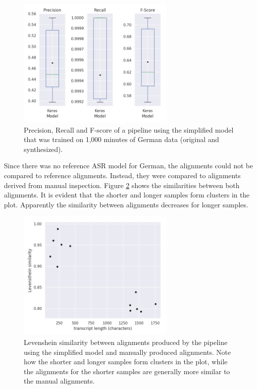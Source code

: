 \documentclass[letterpaper]{article}
\begin{document}
\begin{figure}[!htb]
	\begin{center}
		\includegraphics[width=3in]{boxplot_de.png}
		\caption{Precision, Recall and F-score of a pipeline using the simplified model that was trained on 1,000 minutes of German data (original and synthesized).}
		\label{boxplot_de}
	\end{center}
\end{figure}

Since there was no reference ASR model for German, the alignments could not be compared to reference alignments. Instead, they were compared to alignments derived from manual inspection. Figure \ref{scatterplot_de} shows the similarities between both alignments. It is evident that the shorter and longer samples form clusters in the plot. Apparently the similarity between alignments decreases for longer samples.

\begin{figure}[!htb]
	\begin{center}
		\includegraphics[width=3in]{scatterplot_de.png}
		\caption{Levenshein similarity between alignments produced by the pipeline using the simplified model and manually produced alignments. Note how the shorter and longer samples form clusters in the plot, while the alignments for the shorter samples are generally more similar to the manual alignments.}
		\label{scatterplot_de}
	\end{center}
\end{figure}
\end{document}
